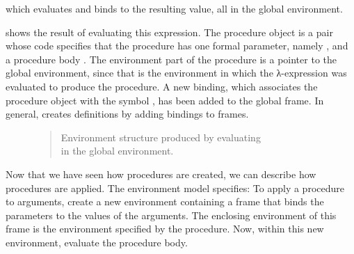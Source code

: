 \noindent
which evaluates  and binds  to the
resulting value, all in the global environment.

 shows the result of evaluating this  expression.
The procedure object is a pair whose code specifies that the procedure has one
formal parameter, namely , and a procedure body .  The
environment part of the procedure is a pointer to the global environment, since
that is the environment in which the λ-expression was evaluated to
produce the procedure. A new binding, which associates the procedure object
with the symbol , has been added to the global frame.  In general,
 creates definitions by adding bindings to frames.

\begin{figure}[tb]
\label{Figure 3.2}
\centering
\begin{comment}
\heading{Figure 3.2:} Environment structure produced by
evaluating \code{(define (square x) (* x x))} in the global environment.

\begin{example}
           +----------------------+
           | other variables      |
global --->|                      |
env        | square: --+          |
           +-----------|----------+
                       |       ^
(define (square x)     |       |
  (* x x))             V       |
                   .---.---.   |
                   | O | O-+---+
                   `-|-^---'
                     |
                     V
                   parameters: x
                   body: (* x x)
\end{example}
\end{comment}

\begin{quote}
 Environment structure produced by evaluating \\  in the global environment.
\end{quote}
\end{figure}

Now that we have seen how procedures are created, we can describe how
procedures are applied.  The environment model specifies: To apply a procedure
to arguments, create a new environment containing a frame that binds the
parameters to the values of the arguments.  The enclosing environment of this
frame is the environment specified by the procedure.  Now, within this new
environment, evaluate the procedure body.

